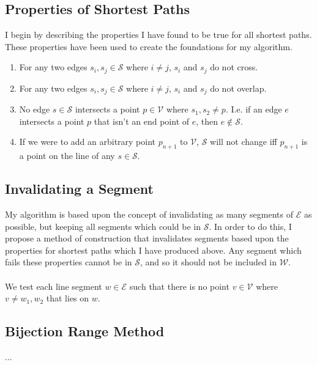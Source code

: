 \documentclass[12pt]{article}
\begin{document}
\subsection{Properties of Shortest Paths}\label{subsec:props}
I begin by describing the properties I have found to be true for all shortest
paths. These properties have been used to create the foundations for my algorithm.
\begin{enumerate}
\item For any two edges $s_i,s_j \in \mathcal{S}$ where
$i \neq j$, $s_i$ and $s_j$ do not cross. 
\item For any two edges $s_i,s_j \in \mathcal{S}$ where
$i \neq j$, $s_i$ and $s_j$ do not overlap. 
\item No edge $s \in \mathcal{S}$ intersects a point
$p \in \mathcal{V}$ where $s_1,s_2 \neq p$.
I.e. if an edge $e$ intersects a point $p$ that isn't an end point of $e$,
then $e \notin \mathcal{S}$.
\item If we were to add an arbitrary point $p_{n+1}$ to $\mathcal{V}$, $\mathcal{S}$
will not change iff $p_{n+1}$ is a point on the line of any $s \in \mathcal{S}$.
\end{enumerate}

\subsection{Invalidating a Segment}\label{subsec:invalid}
My algorithm is based upon the concept of invalidating as many segments of $\mathcal{E}$
as possible, but keeping all segments which could be in $\mathcal{S}$.
In order to do this,
I propose a method of construction that invalidates segments based upon the
properties for shortest paths which I have produced
above. Any segment which fails these properties cannot be in $\mathcal{S}$,
and so it should
not be included in $\mathcal{W}$.
\\\\
We test each line segment $w \in \mathcal{E}$ such that there is no point
$v \in \mathcal{V}$
where $v \neq w_1,w_2$ that lies on $w$.

\subsection*{Bijection Range Method}\label{subsec*:bijection-range-method}
...
\end{document}
